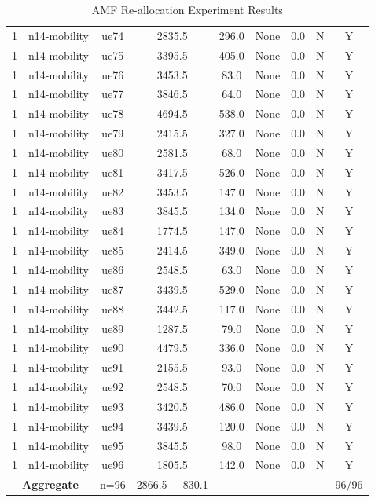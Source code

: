 \begin{table}[ht]
\begin{tabular}{|c|c|c|c|c|c|c|c|c|}
1 & n14-mobility & ue74 & 2835.5 & 296.0 & None & 0.0 & N & Y \\
1 & n14-mobility & ue75 & 3395.5 & 405.0 & None & 0.0 & N & Y \\
1 & n14-mobility & ue76 & 3453.5 & 83.0 & None & 0.0 & N & Y \\
1 & n14-mobility & ue77 & 3846.5 & 64.0 & None & 0.0 & N & Y \\
1 & n14-mobility & ue78 & 4694.5 & 538.0 & None & 0.0 & N & Y \\
1 & n14-mobility & ue79 & 2415.5 & 327.0 & None & 0.0 & N & Y \\
1 & n14-mobility & ue80 & 2581.5 & 68.0 & None & 0.0 & N & Y \\
1 & n14-mobility & ue81 & 3417.5 & 526.0 & None & 0.0 & N & Y \\
1 & n14-mobility & ue82 & 3453.5 & 147.0 & None & 0.0 & N & Y \\
1 & n14-mobility & ue83 & 3845.5 & 134.0 & None & 0.0 & N & Y \\
1 & n14-mobility & ue84 & 1774.5 & 147.0 & None & 0.0 & N & Y \\
1 & n14-mobility & ue85 & 2414.5 & 349.0 & None & 0.0 & N & Y \\
1 & n14-mobility & ue86 & 2548.5 & 63.0 & None & 0.0 & N & Y \\
1 & n14-mobility & ue87 & 3439.5 & 529.0 & None & 0.0 & N & Y \\
1 & n14-mobility & ue88 & 3442.5 & 117.0 & None & 0.0 & N & Y \\
1 & n14-mobility & ue89 & 1287.5 & 79.0 & None & 0.0 & N & Y \\
1 & n14-mobility & ue90 & 4479.5 & 336.0 & None & 0.0 & N & Y \\
1 & n14-mobility & ue91 & 2155.5 & 93.0 & None & 0.0 & N & Y \\
1 & n14-mobility & ue92 & 2548.5 & 70.0 & None & 0.0 & N & Y \\
1 & n14-mobility & ue93 & 3420.5 & 486.0 & None & 0.0 & N & Y \\
1 & n14-mobility & ue94 & 3439.5 & 120.0 & None & 0.0 & N & Y \\
1 & n14-mobility & ue95 & 3845.5 & 98.0 & None & 0.0 & N & Y \\
1 & n14-mobility & ue96 & 1805.5 & 142.0 & None & 0.0 & N & Y \\
\multicolumn{2}{|c|}{\textbf{Aggregate}} & n=96 & 2866.5 $\pm$ 830.1 & -- & -- & -- & -- & 96/96 \\
\hline
\end{tabular}
\caption{AMF Re-allocation Experiment Results}
\label{tab:amf_realloc}
\end{table}

